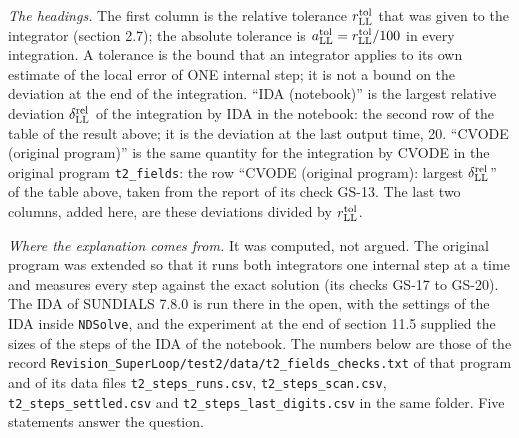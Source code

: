 \documentclass[
  10pt,
]{article}
\begin{document}
\emph{The headings.} The first column is the relative tolerance
\(r^{\rm tol}_{\rm LL}\) that was given to the integrator (section 2.7);
the absolute tolerance is
\(a^{\rm tol}_{\rm LL}=r^{\rm tol}_{\rm LL}/100\) in every integration.
A tolerance is the bound that an integrator applies to its own estimate
of the local error of ONE internal step; it is not a bound on the
deviation at the end of the integration. ``IDA (notebook)'' is the
largest relative deviation \(\delta^{\rm rel}_{\rm LL}\) of the
integration by IDA in the notebook: the second row of the table of the
result above; it is the deviation at the last output time, 20. ``CVODE
(original program)'' is the same quantity for the integration by CVODE
in the original program \texttt{t2\_fields}: the row ``CVODE (original
program): largest \(\delta^{\rm rel}_{\rm LL}\)'' of the table above,
taken from the report of its check GS-13. The last two columns, added
here, are these deviations divided by \(r^{\rm tol}_{\rm LL}\).

\emph{Where the explanation comes from.} It was computed, not argued.
The original program was extended so that it runs both integrators one
internal step at a time and measures every step against the exact
solution (its checks GS-17 to GS-20). The IDA of SUNDIALS 7.8.0 is run
there in the open, with the settings of the IDA inside \texttt{NDSolve},
and the experiment at the end of section 11.5 supplied the sizes of the
steps of the IDA of the notebook. The numbers below are those of the
record \texttt{Revision\_SuperLoop/test2/data/t2\_fields\_checks.txt} of
that program and of its data files \texttt{t2\_steps\_runs.csv},
\texttt{t2\_steps\_scan.csv}, \texttt{t2\_steps\_settled.csv} and
\texttt{t2\_steps\_last\_digits.csv} in the same folder. Five statements
answer the question.
\end{document}
